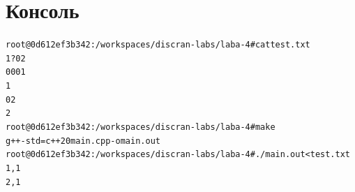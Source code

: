 \section{Консоль}
\begin{alltt}
root@0d612ef3b342:/workspaces/discran-labs/laba-4# cat test.txt
1 ? 02
0001
1
02
2
root@0d612ef3b342:/workspaces/discran-labs/laba-4# make
g++ -std=c++20 main.cpp -o main.out
root@0d612ef3b342:/workspaces/discran-labs/laba-4# ./main.out < test.txt
1, 1
2, 1
\end{alltt}
\pagebreak

